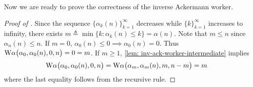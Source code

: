 Now we are ready to prove the correctness of the inverse Ackermann worker.
\begin{proof}[Proof of ]
	Since the sequence $\big\{\alpha_k(n)\big\}_{k=1}^{\infty}$ decreases while $\{k\}_{k=1}^{\infty}$ increases to infinity, there exists $m \triangleq \min\big\{k : \alpha_k(n) \le k \} = \alpha(n)$. Note that $m\le n$ since $\alpha_n(n)\le n$.
	If $m = 0$, $\alpha_0(n)\le 0 \!\! \implies \!\! \alpha_0(n) = 0$. Thus $\text{W}\alpha\big(\alpha_0, \alpha_0(n), 0, n\big) = 0 = m$. If $m \ge 1$, \cref{lem: inv-ack-worker-intermediate} implies
	$$ \text{W}\alpha\big(\alpha_0, \alpha_0(n), 0, n\big) = \text{W}\alpha\big(\alpha_m, \alpha_m(n), m, n - m\big) = m $$
	where the last equality follows from the recursive rule.
\end{proof}



